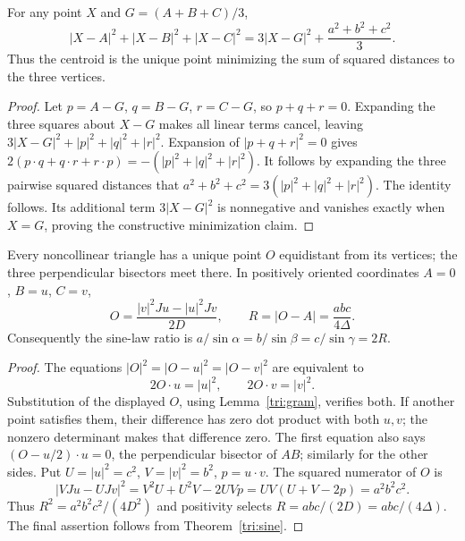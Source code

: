 \begin{theorem}
\label{tri:leibniz}
For any point $X$ and $G=(A+B+C)/3$,
\[
 |X-A|^2+|X-B|^2+|X-C|^2
 =3|X-G|^2+\frac{a^2+b^2+c^2}{3}.
\]
Thus the centroid is the unique point minimizing the sum of squared
distances to the three vertices.
\end{theorem}
\begin{proof}
Let $p=A-G$, $q=B-G$, $r=C-G$, so $p+q+r=0$.
Expanding the three squares about $X-G$ makes all linear terms cancel,
leaving $3|X-G|^2+|p|^2+|q|^2+|r|^2$.
Expansion of $|p+q+r|^2=0$ gives
$2(p\mathbin{\cdot}q+q\mathbin{\cdot}r+r\mathbin{\cdot}p)
=-(|p|^2+|q|^2+|r|^2)$.
It follows by expanding the three pairwise squared distances that
$a^2+b^2+c^2=3(|p|^2+|q|^2+|r|^2)$.
The identity follows.  Its additional term $3|X-G|^2$ is nonnegative and
vanishes exactly when $X=G$, proving the constructive minimization claim.
\end{proof}

\begin{theorem}
\label{tri:circumcenter}
Every noncollinear triangle has a unique point $O$ equidistant from its
vertices; the three perpendicular bisectors meet there.  In positively
oriented coordinates $A=0$, $B=u$, $C=v$,
\[
 O=\frac{|v|^2Ju-|u|^2Jv}{2D},\qquad
 R=|O-A|=\frac{abc}{4\Delta}.
\]
Consequently the sine-law ratio is $a/\sin\alpha=b/\sin\beta=
c/\sin\gamma=2R$.
\end{theorem}
\begin{proof}
The equations $|O|^2=|O-u|^2=|O-v|^2$ are equivalent to
\[
 2O\mathbin{\cdot}u=|u|^2,\qquad
 2O\mathbin{\cdot}v=|v|^2.
\]
Substitution of the displayed $O$, using Lemma~\ref{tri:gram}, verifies
both.  If another point satisfies them, their difference has zero dot
product with both $u,v$; the nonzero determinant makes that difference
zero.  The first equation also says
$(O-u/2)\mathbin{\cdot}u=0$, the perpendicular bisector of $AB$;
similarly for the other sides.
Put $U=|u|^2=c^2$, $V=|v|^2=b^2$, $p=u\mathbin{\cdot}v$.
The squared numerator of $O$ is
\[
 |VJu-UJv|^2=V^2U+U^2V-2UVp
 =UV(U+V-2p)=a^2b^2c^2.
\]
Thus $R^2=a^2b^2c^2/(4D^2)$ and positivity selects
$R=abc/(2D)=abc/(4\Delta)$.
The final assertion follows from Theorem~\ref{tri:sine}.
\end{proof}

